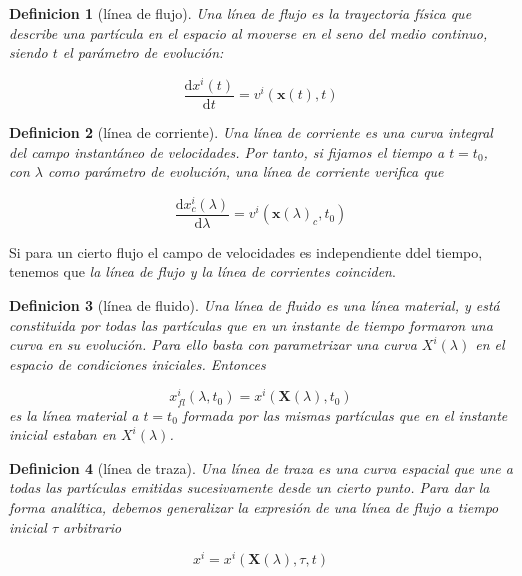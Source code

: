 \documentclass[12pt,a4paper]{article}
\numberwithin{equation}{section}
\numberwithin{figure}{section}
\newcommand{\D}{\mathrm{d}}
\newcommand{\xn}{\mathbf{x}}
\newcommand{\Xn}{\mathbf{X}}
\newtheorem{definition}{Definicion}[section]
\begin{document}
\begin{definition}[línea de flujo]
Una línea de flujo es la trayectoria física que describe una partícula en el espacio al moverse en el seno del medio continuo, siendo $t$ el parámetro de evolución:

\begin{equation}
\dfrac{\D x^i (t)}{\D t} = v^i ( \xn(t),t)
\end{equation}

\end{definition}


\begin{definition}[línea de corriente]
Una línea de corriente es una curva integral del campo instantáneo de velocidades. Por tanto, si fijamos el tiempo a $t=t_0$, con $\lambda$ como parámetro de evolución, una línea de corriente verifica que

\begin{equation}
\dfrac{\D x^i_c (\lambda)}{\D \lambda} = v^i ( \xn(\lambda)_c,t_0)
\end{equation}
\end{definition}

Si para un cierto flujo el campo de velocidades es independiente ddel tiempo, tenemos que \textit{la línea de flujo y la línea de corrientes coinciden}. 


\begin{definition}[línea de fluido]
Una línea de fluido es una línea material, y está constituida por todas las partículas que en un instante de tiempo formaron una curva en su evolución. Para ello basta con parametrizar una curva $X^i (\lambda)$ en el espacio de condiciones iniciales. Entonces

\begin{equation}
x^i_{fl} (\lambda,t_0)  = x^i (\Xn(\lambda),t_0)
\end{equation}
es la línea material a $t=t_0$ formada por las mismas partículas que en el instante inicial estaban en $X^i (\lambda)$. 
\end{definition}


\begin{definition}[línea de traza]
Una línea de traza es una curva espacial que une a todas las partículas emitidas sucesivamente desde un cierto punto. Para dar la forma analítica, debemos generalizar la expresión de una línea de flujo a tiempo inicial $\tau$ arbitrario

\begin{equation}
x^i = x^i (\Xn(\lambda),\tau,t)
\end{equation}

\end{definition}
\end{document}
